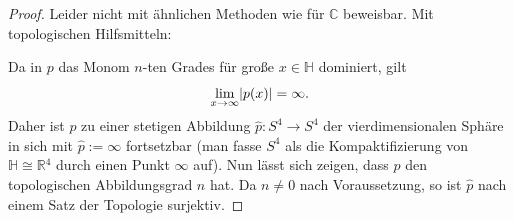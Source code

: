 \documentclass[aspectratio=169]{beamer}
\newcommand{\Ham}{\ensuremath{\mathbb{H}}{ }}
\newcommand{\R}{\ensuremath{\mathbb{R}}{ }}
\DeclarePairedDelimiter\abs{\lvert}{\rvert}
\begin{document}
    \begin{frame}
        \begin{proof}
            Leider nicht mit ähnlichen Methoden wie für \(\mathbb{C}\) beweisbar.  
            Mit topologischen Hilfsmitteln:

            Da in \(p\) das Monom \(n\)-ten Grades für große \(x \in \Ham\) dominiert, gilt
            \[
                \lim_{x \to \infty} \abs{p(x)} = \infty
            .\]
            Daher ist \(p\) zu einer stetigen Abbildung \(\hat{p} \colon S^4 \to S^4\) der vierdimensionalen Sphäre in sich mit \(\hat{p} := \infty\) fortsetzbar (man fasse \(S^4\) als die Kompaktifizierung von \(\Ham \cong \R^4\) durch einen Punkt \(\infty\) auf).
            Nun lässt sich zeigen, dass \(\hat{p}\) den topologischen Abbildungsgrad \(n\) hat.
            Da \(n \neq 0\) nach Voraussetzung, so ist \(\hat{p}\) nach einem Satz der Topologie surjektiv.
        \end{proof}
    \end{frame}

    \begin{frame}[allowframebreaks]
        \printbibliography[title={Quellen \& Verweise}]
    \end{frame}
\end{document}
